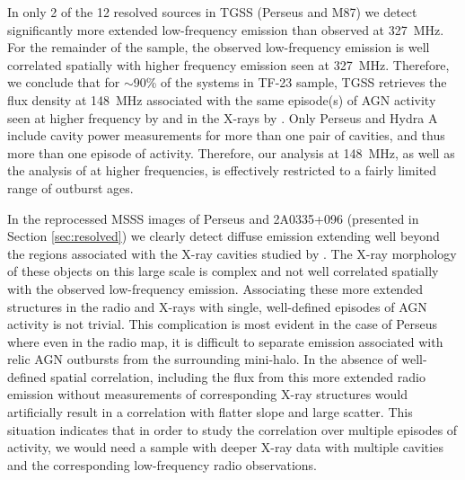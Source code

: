 \documentclass{aa}  %
\begin{document}
In only 2 of the 12 resolved sources in TGSS (Perseus and M87) we detect significantly more extended low-frequency emission than observed at 327~MHz.
For the remainder of the sample, the observed low-frequency emission is well correlated spatially with higher frequency emission seen at 327~MHz.
Therefore, we conclude that for $\sim$90\% of the systems in TF-23 sample, TGSS retrieves the flux density at 148~MHz associated with the same episode(s) of AGN activity seen at higher frequency by \cite{Birzan2008} and in the X-rays by \cite{Rafferty2006}.
Only Perseus and Hydra A include cavity power measurements for more than one pair of cavities, and thus more than one episode of activity. 
Therefore, our analysis at 148~MHz, as well as the analysis of \cite{Birzan2008} at higher frequencies, is effectively restricted to a fairly limited range of outburst ages. 

In the reprocessed MSSS images of Perseus and 2A0335+096 (presented in Section \ref{sec:resolved}) we clearly detect diffuse emission extending well beyond the regions associated with the X-ray cavities studied by \cite{Rafferty2006}. 
The X-ray morphology of these objects on this large scale is complex and not well correlated spatially with the observed low-frequency emission.
Associating these more extended structures in the radio and X-rays with single, well-defined episodes of AGN activity is not trivial.
This complication is most evident in the case of Perseus where even in the radio map, it is difficult to separate emission associated with relic AGN outbursts from the surrounding mini-halo.
In the absence of well-defined spatial correlation, including the flux from this more extended radio emission without measurements of corresponding X-ray structures would artificially result in a correlation with flatter slope and large scatter.
This situation indicates that in order to study the correlation over multiple episodes of activity, we would need a sample with deeper X-ray data with multiple cavities and the corresponding low-frequency radio observations.
\end{document}
